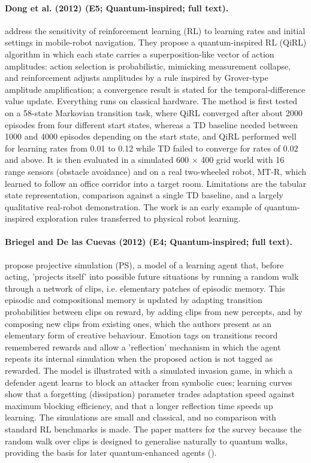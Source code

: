 \documentclass[10pt,a4paper]{article}
\begin{document}
\paragraph{Dong et al. (2012) (E5; Quantum-inspired; full text).} \citet{Dong2012} address the sensitivity of reinforcement learning (RL) to learning rates and initial settings in mobile-robot navigation. They propose a quantum-inspired RL (QiRL) algorithm in which each state carries a superposition-like vector of action amplitudes: action selection is probabilistic, mimicking measurement collapse, and reinforcement adjusts amplitudes by a rule inspired by Grover-type amplitude amplification; a convergence result is stated for the temporal-difference value update. Everything runs on classical hardware. The method is first tested on a 58-state Markovian transition task, where QiRL converged after about 2000 episodes from four different start states, whereas a TD baseline needed between 1000 and 4000 episodes depending on the start state, and QiRL performed well for learning rates from 0.01 to 0.12 while TD failed to converge for rates of 0.02 and above. It is then evaluated in a simulated 600 $\times$ 400 grid world with 16 range sensors (obstacle avoidance) and on a real two-wheeled robot, MT-R, which learned to follow an office corridor into a target room. Limitations are the tabular state representation, comparison against a single TD baseline, and a largely qualitative real-robot demonstration. The work is an early example of quantum-inspired exploration rules transferred to physical robot learning.

\paragraph{Briegel and De las Cuevas (2012) (E4; Quantum-inspired; full text).} \citet{Briegel2012} propose projective simulation (PS), a model of a learning agent that, before acting, 'projects itself' into possible future situations by running a random walk through a network of clips, i.e. elementary patches of episodic memory. This episodic and compositional memory is updated by adapting transition probabilities between clips on reward, by adding clips from new percepts, and by composing new clips from existing ones, which the authors present as an elementary form of creative behaviour. Emotion tags on transitions record remembered rewards and allow a 'reflection' mechanism in which the agent repeats its internal simulation when the proposed action is not tagged as rewarded. The model is illustrated with a simulated invasion game, in which a defender agent learns to block an attacker from symbolic cues; learning curves show that a forgetting (dissipation) parameter trades adaptation speed against maximum blocking efficiency, and that a longer reflection time speeds up learning. The simulations are small and classical, and no comparison with standard RL benchmarks is made. The paper matters for the survey because the random walk over clips is designed to generalise naturally to quantum walks, providing the basis for later quantum-enhanced agents (\citep{Paparo2014}).
\end{document}
